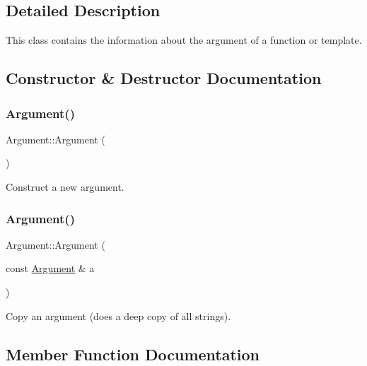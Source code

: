 \subsection{Detailed Description}
This class contains the information about the argument of a function or template. 



\subsection{Constructor \& Destructor Documentation}
\mbox{\label{struct_argument_a21f78c9b347967aa8bf77e5d3f35592f}} 
\subsubsection{\texorpdfstring{Argument()}{Argument()}\hspace{0.1cm}{\footnotesize\ttfamily [1/2]}}
{\footnotesize\ttfamily Argument\+::\+Argument (\begin{DoxyParamCaption}{ }\end{DoxyParamCaption})\hspace{0.3cm}{\ttfamily [inline]}}

Construct a new argument. \mbox{\label{struct_argument_a87adc78036a4e04a05692bd13f90d91a}} 
\subsubsection{\texorpdfstring{Argument()}{Argument()}\hspace{0.1cm}{\footnotesize\ttfamily [2/2]}}
{\footnotesize\ttfamily Argument\+::\+Argument (\begin{DoxyParamCaption}\item[{const \mbox{\hyperlink{struct_argument}{Argument}} \&}]{a }\end{DoxyParamCaption})\hspace{0.3cm}{\ttfamily [inline]}}

Copy an argument (does a deep copy of all strings). 

\subsection{Member Function Documentation}
\mbox{\label{struct_argument_aca66c2b989361c43f7e1adfe9d7f125d}} 
